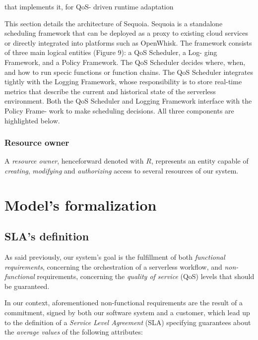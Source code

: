 \documentclass[12pt,a4paper]{report}
\begin{document}
 that implements it, for QoS-
driven runtime adaptation 


This section details the architecture of Sequoia. Sequoia is a
standalone scheduling framework that can be deployed as a
proxy to existing cloud services or directly integrated into
platforms such as OpenWhisk. The framework consists of
three main logical entities (Figure 9): a QoS Scheduler, a Log-
ging Framework, and a Policy Framework. The QoS Scheduler
decides where, when, and how to run specic functions or
function chains. The QoS Scheduler integrates tightly with
the Logging Framework, whose responsibility is to store
real-time metrics that describe the current and historical
state of the serverless environment. Both the QoS Scheduler
and Logging Framework interface with the Policy Frame-
work to make scheduling decisions. All three components
are highlighted below.






\subsection{Resource owner}

A \textit{resource owner}, henceforward denoted with $R$, represents an entity capable of \textit{creating}, \textit{modifying} and \textit{authorizing} access to several resources of our system.

\newpage

\chapter{Model's formalization}

\section{SLA's definition}

As said previously, our system's goal is the fulfillment of both \textit{functional requirements}, concerning the orchestration of a serverless workflow, and \textit{non-functional} requirements, concerning the \textit{quality of service} (QoS) levels that should be guaranteed.

In our context, aforementioned non-functional requirements are the result of a commitment, signed by both our software system and a customer, which lead  up to the definition of a \textit{Service Level Agreement} (SLA) specifying guarantees about the \textit{average values} of the following attributes:
\end{document}

